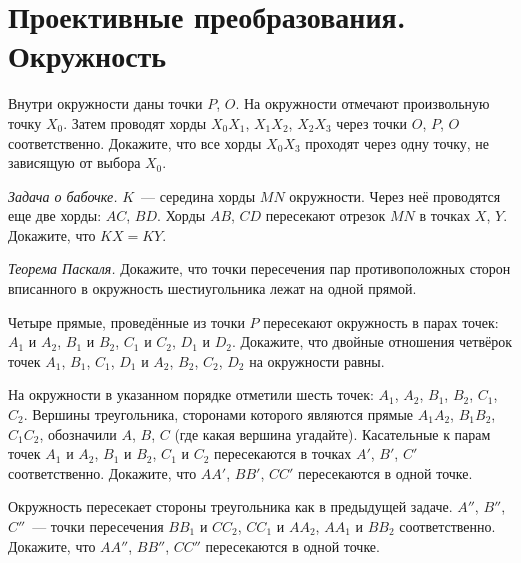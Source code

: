 

\section*{Проективные преобразования. Окружность}


\begin{problems}

\item
Внутри окружности даны точки $P$, $O$.
На окружности отмечают произвольную точку $X_0$.
Затем проводят хорды $X_0 X_1$, $X_1 X_2$, $X_2 X_3$ через точки $O$, $P$, $O$
соответственно.
Докажите, что все хорды $X_0 X_3$ проходят через одну точку, не зависящую от
выбора $X_0$.

\item\emph{Задача о бабочке.}
$K$~--- середина хорды $MN$ окружности.
Через неё проводятся еще две хорды: $AC$, $BD$.
Хорды $AB$, $CD$ пересекают отрезок $MN$ в точках $X$, $Y$.
Докажите, что $KX = KY$.

\item\emph{Теорема Паскаля.}
Докажите, что точки пересечения пар противоположных сторон вписанного в
окружность шестиугольника лежат на одной прямой.

\item
Четыре прямые, проведённые из точки $P$ пересекают окружность в парах точек:
$A_1$ и $A_2$, $B_1$ и $B_2$, $C_1$ и $C_2$, $D_1$ и $D_2$.
Докажите, что двойные отношения четвёрок точек $A_1$, $B_1$, $C_1$, $D_1$ и
$A_2$, $B_2$, $C_2$, $D_2$ на окружности равны.

\item
На окружности в указанном порядке отметили шесть точек:
$A_1$, $A_2$, $B_1$, $B_2$, $C_1$, $C_2$.
Вершины треугольника, сторонами которого являются прямые $A_1 A_2$, $B_1 B_2$,
$C_1 C_2$, обозначили $A$, $B$, $C$ (где какая вершина угадайте).
Касательные к парам точек $A_1$ и $A_2$, $B_1$ и $B_2$, $C_1$ и $C_2$
пересекаются в точках $A'$, $B'$, $C'$ соответственно.
Докажите, что $A A'$, $B B'$, $C C'$ пересекаются в одной точке.

\item
Окружность пересекает стороны треугольника как в предыдущей задаче.
$A''$, $B''$, $C''$~--- точки пересечения $B B_1$ и $C C_2$, $C C_1$ и $A A_2$,
$A A_1$ и $BB_2$ соответственно.
Докажите, что $A A''$, $B B''$, $C C''$ пересекаются в одной точке.


\end{problems}
